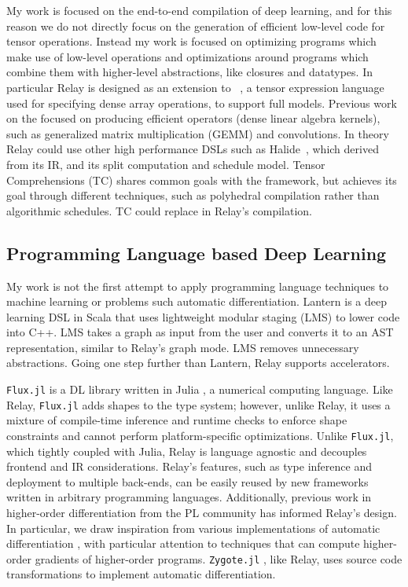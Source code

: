 My work is focused on the end-to-end compilation of deep learning, and for
  this reason we do not directly focus on the generation of efficient low-level code for
  tensor operations.
Instead my work is focused on optimizing programs which make use of low-level operations
  and optimizations around programs which combine them with higher-level abstractions,
  like closures and datatypes.
In particular Relay is designed as an extension to \tvm~\citep{tvm_osdi18},
  a tensor expression language used for specifying dense array
  operations, to support full models.
Previous work on the \tvm focused on producing efficient operators
  (dense linear algebra kernels), such as generalized matrix multiplication (GEMM) and convolutions.
In theory Relay could use other high performance DSLs such as Halide~\citep{halide},
    which \tvm derived from its IR, and its split computation and schedule model.
Tensor Comprehensions (TC) shares common goals with the \tvm framework, but achieves its goal
through different techniques, such as polyhedral compilation rather than algorithmic
schedules. TC could replace \tvm in Relay{}'s compilation.

\subsection{Programming Language based Deep Learning}

My work is not the first attempt to apply programming language
    techniques to machine learning or problems such automatic differentiation.
Lantern \citep{lantern} is a deep learning DSL in Scala
    that uses lightweight modular staging (LMS) to lower code into C++.
LMS takes a graph as input from the user and converts it to an AST
    representation, similar to Relay's graph mode.
LMS removes unnecessary abstractions.
Going one step further than Lantern,
    Relay supports accelerators.

\verb|Flux.jl| \citep{fluxjl} is a DL library written in Julia \citep{julia}, a numerical
computing language. Like Relay, \verb|Flux.jl|
  adds shapes to the type system; however, unlike Relay, it
  uses a mixture of compile-time inference and runtime checks to enforce shape constraints
  \citep{jlmlpl} and cannot perform platform-specific optimizations.
Unlike \verb|Flux.jl|, which tightly coupled with Julia, Relay is language agnostic
  and decouples frontend and IR considerations.
Relay's features, such as type inference and deployment to multiple back-ends, can
    be easily reused by new frameworks written in arbitrary programming languages.
Additionally, previous work in higher-order differentiation from the PL community
has informed Relay's design.
In particular, we draw inspiration from various implementations of
automatic differentiation \citep{beautiful_diff, ad_survey, haskell_ad, toplas_reverse, wang_reverse, DLS, DDF},
with particular attention to techniques that can compute higher-order gradients of higher-order programs.
\verb|Zygote.jl| \citep{zygotejl}, like Relay, uses source code transformations to
    implement automatic differentiation.

